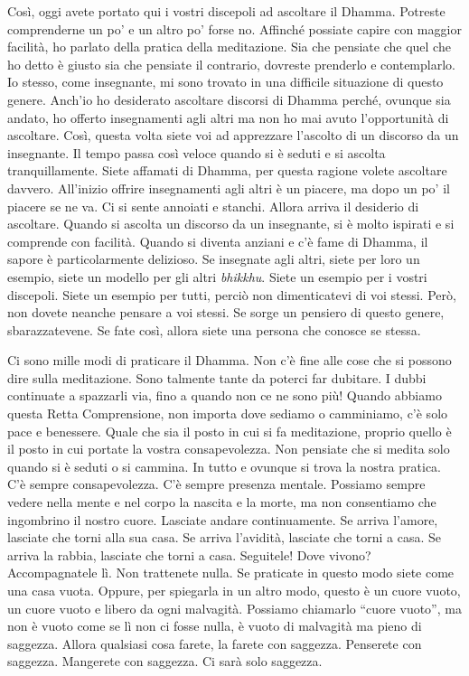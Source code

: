 Così, oggi avete portato qui i vostri discepoli ad ascoltare il Dhamma.
Potreste comprenderne un po' e un altro po' forse no. Affinché possiate
capire con maggior facilità, ho parlato della pratica della meditazione.
Sia che pensiate che quel che ho detto è giusto sia che pensiate il
contrario, dovreste prenderlo e contemplarlo. Io stesso, come
insegnante, mi sono trovato in una difficile situazione di questo
genere. Anch'io ho desiderato ascoltare discorsi di Dhamma perché,
ovunque sia andato, ho offerto insegnamenti agli altri ma non ho mai
avuto l'opportunità di ascoltare. Così, questa volta siete voi ad
apprezzare l'ascolto di un discorso da un insegnante. Il tempo passa
così veloce quando si è seduti e si ascolta tranquillamente. Siete
affamati di Dhamma, per questa ragione volete ascoltare davvero.
All'inizio offrire insegnamenti agli altri è un piacere, ma dopo un po'
il piacere se ne va. Ci si sente annoiati e stanchi. Allora arriva il
desiderio di ascoltare. Quando si ascolta un discorso da un insegnante,
si è molto ispirati e si comprende con facilità. Quando si diventa
anziani e c'è fame di Dhamma, il sapore è particolarmente delizioso. Se
insegnate agli altri, siete per loro un esempio, siete un modello per
gli altri \emph{bhikkhu}. Siete un esempio per i vostri discepoli. Siete
un esempio per tutti, perciò non dimenticatevi di voi stessi. Però, non
dovete neanche pensare a voi stessi. Se sorge un pensiero di questo
genere, sbarazzatevene. Se fate così, allora siete una persona che
conosce se stessa.

Ci sono mille modi di praticare il Dhamma. Non c'è fine alle cose che si
possono dire sulla meditazione. Sono talmente tante da poterci far
dubitare. I dubbi continuate a spazzarli via, fino a quando non ce ne
sono più! Quando abbiamo questa Retta Comprensione, non importa dove
sediamo o camminiamo, c'è solo pace e benessere. Quale che sia il posto
in cui si fa meditazione, proprio quello è il posto in cui portate la
vostra consapevolezza. Non pensiate che si medita solo quando si è
seduti o si cammina. In tutto e ovunque si trova la nostra pratica. C'è
sempre consapevolezza. C'è sempre presenza mentale. Possiamo sempre
vedere nella mente e nel corpo la nascita e la morte, ma non consentiamo
che ingombrino il nostro cuore. Lasciate andare continuamente. Se arriva
l'amore, lasciate che torni alla sua casa. Se arriva l'avidità, lasciate
che torni a casa. Se arriva la rabbia, lasciate che torni a casa.
Seguitele! Dove vivono? Accompagnatele lì. Non trattenete nulla. Se
praticate in questo modo siete come una casa vuota. Oppure, per
spiegarla in un altro modo, questo è un cuore vuoto, un cuore vuoto e
libero da ogni malvagità. Possiamo chiamarlo ``cuore vuoto'', ma non è
vuoto come se lì non ci fosse nulla, è vuoto di malvagità ma pieno di
saggezza. Allora qualsiasi cosa farete, la farete con saggezza.
Penserete con saggezza. Mangerete con saggezza. Ci sarà solo saggezza.

